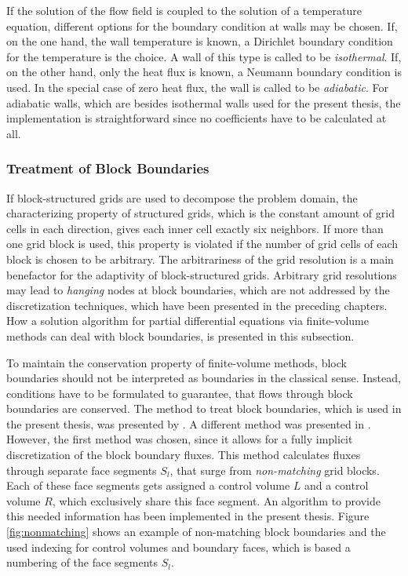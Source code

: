 If the solution of the flow field is coupled to the solution of a temperature equation, different options for the boundary condition at walls may be chosen. If, on the one hand, the wall temperature is known, a Dirichlet boundary condition for the temperature is the choice. A wall of this type is called to be \emph{isothermal}. If, on the other hand, only the heat flux is known, a Neumann boundary condition is used. In the special case of zero heat flux, the wall is called to be \emph{adiabatic}. For adiabatic walls, which are besides isothermal walls used for the present thesis, the implementation is straightforward since no coefficients have to be calculated at all.

\subsubsection{Treatment of Block Boundaries}
\label{sec:blockboundaries}

If block-structured grids are used to decompose the problem domain, the characterizing property of structured grids, which is the constant amount of grid cells in each direction, gives each inner cell exactly six neighbors. If more than one grid block is used, this property is violated if the number of grid cells of each block is chosen to be arbitrary. The arbitrariness of the grid resolution is a main benefactor for the adaptivity of block-structured grids. Arbitrary grid resolutions may lead to \emph{hanging} nodes at block boundaries, which are not addressed by the discretization techniques, which have been presented in the preceding chapters. How a solution algorithm for partial differential equations via finite-volume methods can deal with block boundaries, is presented in this subsection.

To maintain the conservation property \cite{schaefer99} of finite-volume methods, block boundaries should not be interpreted as boundaries in the classical sense. Instead, conditions have to be formulated to guarantee, that flows through block boundaries are conserved. The method to treat block boundaries, which is used in the present thesis, was presented by \cite{lilek97}. A different method was presented in \cite{lange02}. However, the first method was chosen, since it allows for a fully implicit discretization of the block boundary fluxes. This method calculates fluxes through separate face segments \(S_l\), that surge from \emph{non-matching} grid blocks. Each of these face segments gets assigned a control volume \(L\) and a control volume \(R\), which exclusively share this face segment. An algorithm to provide this needed information has been implemented in the present thesis. Figure \ref{fig:nonmatching} shows an example of non-matching block boundaries and the used indexing for control volumes and boundary faces, which is based a numbering of the face segments \(S_l\).

